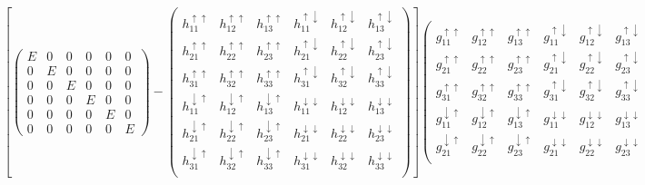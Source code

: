 \documentclass[10pt,prb,showpacs,amssymb,floatfix]{revtex4-1}
\newcommand{\dna}{\downarrow}
\newcommand{\upa}{\uparrow}
\begin{document}
 \begin{align}
\left[ \left(\begin{array}{cccccc} 
 E   &  0 & 0 &  0 & 0 &  0  \\
0 & E & 0 & 0 &  0 & 0 \\
  0 & 0 & E & 0 &  0 & 0 \\
0 &  0 & 0 & E &  0 & 0 \\
 0 & 0 & 0 & 0 &  E & 0 \\
   0 & 0 & 0 & 0 &  0 & E
\end{array}\right) -
 \left(\begin{array}{cccccc} 
h_{11}^{\upa\upa}   & h_{12}^{\upa\upa} &   h_{13}^{\upa\upa} &  h_{11}^{\upa\dna}  & h_{12}^{\upa\dna}  & h_{13}^{\upa\dna}\\
h_{21}^{\upa\upa}   & h_{22}^{\upa\upa} &   h_{23}^{\upa\upa} &  h_{21}^{\upa\dna}  & h_{22}^{\upa\dna}  & h_{23}^{\upa\dna} \\
h_{31}^{\upa\upa}   & h_{32}^{\upa\upa} &   h_{33}^{\upa\upa}  &  h_{31}^{\upa\dna}  & h_{32}^{\upa\dna} & h_{33}^{\upa\dna} \\
h_{11}^{\dna\upa}   & h_{12}^{\dna\upa} &   h_{13}^{\dna\upa} &  h_{11}^{\dna\dna}  & h_{12}^{\dna\dna}  & h_{13}^{\dna\dna}\\
h_{21}^{\dna\upa}   & h_{22}^{\dna\upa} &   h_{23}^{\dna\upa} &  h_{21}^{\dna\dna}  & h_{22}^{\dna\dna}  & h_{23}^{\dna\dna} \\
h_{31}^{\dna\upa}   & h_{32}^{\dna\upa} &   h_{33}^{\dna\upa} &  h_{31}^{\dna\dna}  & h_{32}^{\dna\dna}  & h_{33}^{\dna\dna} \\
\end{array}\right) \right]
 \left(\begin{array}{cccccc} 
g_{11}^{\upa\upa}  & g_{12}^{\upa\upa}  & g_{13}^{\upa\upa} &  g_{11}^{\upa\dna}   &  g_{12}^{\upa\dna}    &  g_{13}^{\upa\dna} \\
g_{21}^{\upa\upa}   & g_{22}^{\upa\upa} & g_{23}^{\upa\upa}  &  g_{21}^{\upa\dna}    &  g_{22}^{\upa\dna}   &  g_{23}^{\upa\dna} \\
g_{31}^{\upa\upa}  & g_{32}^{\upa\upa}  & g_{33}^{\upa\upa}  &  g_{31}^{\upa\dna}    &  g_{32}^{\upa\dna}   &  g_{33}^{\upa\dna} \\
g_{11}^{\dna\upa} & g_{12}^{\dna\upa} & g_{13}^{\dna\upa} &  g_{11}^{\dna\dna}  &  g_{12}^{\dna\dna}    &  g_{13}^{\dna\dna} \\
g_{21}^{\dna\upa} & g_{22}^{\dna\upa}  & g_{23}^{\dna\upa} &  g_{21}^{\dna\dna}  &  g_{22}^{\dna\dna}    &  g_{23}^{\dna\dna} \\

\end{array}
\end{align}
\end{document}
